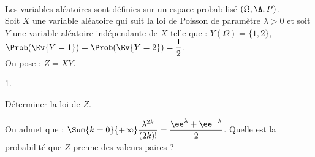\documentclass[11pt]{article}%
\begin{document}
\begin{exerciceSP}~\\
  Les variables aléatoires sont définies sur un espace probabilisé
  $(\Omega,\A,P)$.\\
  Soit $X$ une variable aléatoire qui suit la loi de Poisson de
  paramètre $\lambda>0$ et soit $Y$ une variable aléatoire
  indépendante de $X$ telle que : $Y(\Omega) = \{1, 2\}$,
  $\Prob(\Ev{Y=1}) = \Prob(\Ev{Y=2}) = \dfrac{1}{2}$.\\
  On pose : $Z = XY$.
  \begin{noliste}{1.}
    \setlength{\itemsep}{2mm}
  \item Déterminer la loi de $Z$.
  \item On admet que : $\Sum{k=0}{+\infty} \dfrac{\lambda^{2k}}{(2k)!}
    = \dfrac{\ee^{\lambda}+\ee^{-\lambda}}{2}$. Quelle est la
    probabilité que $Z$ prenne des valeurs paires ?
  \end{noliste}
\end{exerciceSP}


\newpage


\end{document}
